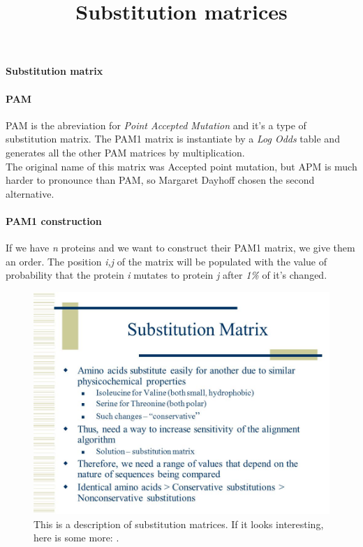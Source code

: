 \documentclass{article}
\begin{document}
  \title{Substitution matrices}
  \date{}
\maketitle

\paragraph{Substitution matrix}

\paragraph{PAM} PAM is the abreviation for \textit{Point Accepted Mutation} and it's a type of substitution matrix. The PAM1 matrix is instantiate by a \textit{ Log Odds } table and  generates all the other PAM matrices by multiplication.\\
The original name of this matrix was Accepted point mutation, but APM is much harder to pronounce than PAM, so Margaret Dayhoff chosen the second alternative.
\paragraph{PAM1 construction}
If we have \textit{n} proteins and we want to construct their PAM1 matrix, we give them an order. The position \textit{i,j} of the matrix will be populated with the value of probability that the protein \textit{i} mutates to protein \textit{j} after \textit{1\%} of it's changed.


\begin{figure}[h!]
  \includegraphics[width=\linewidth]{About_substitution_matrix1.jpg}
 	This is a description of substitution matrices. If it looks interesting, here is some more:
 	\cite{Sub1}.
  \label{fig:boat1}
\end{figure}
\newpage
\end{document}
